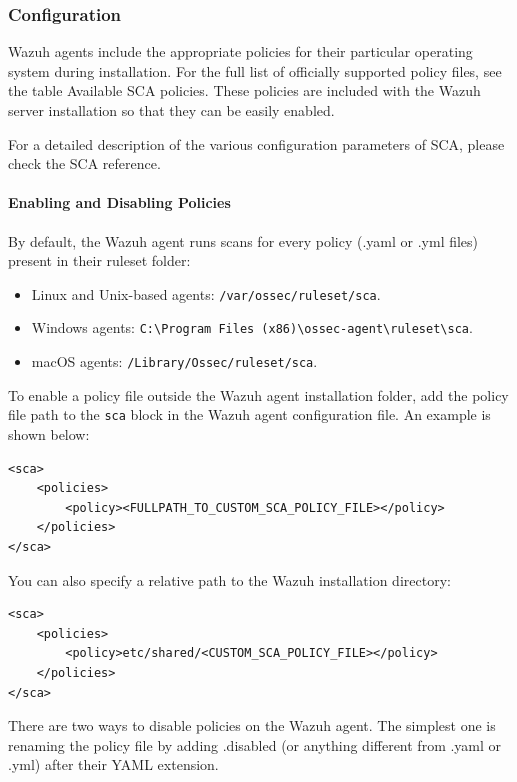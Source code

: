 \subsubsection{Configuration}
Wazuh agents include the appropriate policies for their particular operating system during installation. For the full list of officially supported policy files, see the table Available SCA policies. These policies are included with the Wazuh server installation so that they can be easily enabled.

For a detailed description of the various configuration parameters of SCA, please check the SCA reference.

\paragraph{Enabling and Disabling Policies}
By default, the Wazuh agent runs scans for every policy (.yaml or .yml files) present in their ruleset folder:

\begin{itemize}
    \item Linux and Unix-based agents: \texttt{/var/ossec/ruleset/sca}.
    \item Windows agents: \texttt{C:\textbackslash Program Files (x86)\textbackslash ossec-agent\textbackslash ruleset\textbackslash sca}.
    \item macOS agents: \texttt{/Library/Ossec/ruleset/sca}.
\end{itemize}

To enable a policy file outside the Wazuh agent installation folder, add the policy file path to the \texttt{\textlangle sca\textrangle} block in the Wazuh agent configuration file. An example is shown below:

\begin{verbatim}
<sca>
    <policies>
        <policy><FULLPATH_TO_CUSTOM_SCA_POLICY_FILE></policy>
    </policies>
</sca>
\end{verbatim}

You can also specify a relative path to the Wazuh installation directory:

\begin{verbatim}
<sca>
    <policies>
        <policy>etc/shared/<CUSTOM_SCA_POLICY_FILE></policy>
    </policies>
</sca>
\end{verbatim}

There are two ways to disable policies on the Wazuh agent. The simplest one is renaming the policy file by adding .disabled (or anything different from .yaml or .yml) after their YAML extension.

